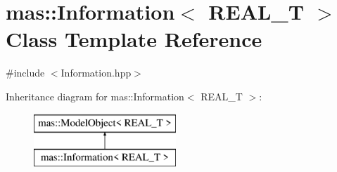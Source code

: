 \hypertarget{classmas_1_1_information}{\section{mas\-:\-:Information$<$ R\-E\-A\-L\-\_\-\-T $>$ Class Template Reference}
\label{classmas_1_1_information}
}


{\ttfamily \#include $<$Information.\-hpp$>$}

Inheritance diagram for mas\-:\-:Information$<$ R\-E\-A\-L\-\_\-\-T $>$\-:\begin{figure}[H]
\begin{center}
\leavevmode
\includegraphics[height=2.000000cm]{classmas_1_1_information}
\end{center}
\end{figure}
